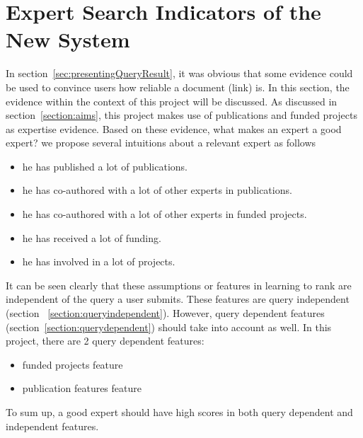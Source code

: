 \section{Expert Search Indicators of the New System}\label{section:goodexpert}
In section~\ref{sec:presentingQueryResult}, it was obvious that some evidence could be used to convince users how reliable a document (link) is.
In this section, the evidence within
the context of this project will be discussed. As discussed in section~\ref{section:aims}, this project makes use of publications and funded projects as 
expertise evidence. Based on these evidence, what makes an expert a good expert? we propose several intuitions about a relevant expert as follows 
\begin{itemize}
 \item he has published a lot of publications.
 \item he has co-authored with a lot of other experts in publications.
 \item he has co-authored with a lot of other experts in funded projects.
 \item he has received a lot of funding.
 \item he has involved in a lot of projects.
\end{itemize}

It can be seen clearly that these assumptions or features in learning to rank are independent of the query a user submits. These features are query independent
(section ~\ref{section:queryindependent}). However, query dependent features (section~\ref{section:querydependent}) should take into account as well. 
In this project, there are 2 query dependent features: 
\begin{itemize}
 \item funded projects feature
 \item publication features feature
\end{itemize}

To sum up, a good expert should have high scores in both query dependent and independent features.

